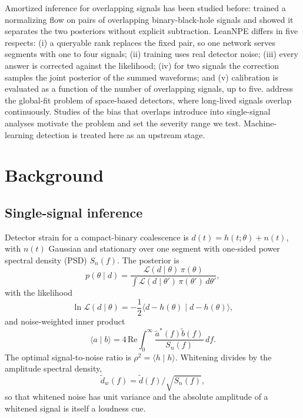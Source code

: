 \documentclass[twocolumn,linenumbers]{aastex701}
\begin{document}
Amortized inference for overlapping signals has been studied before:
\citet{Langendorff2023SBI} trained a normalizing flow on pairs of overlapping
binary-black-hole signals and showed it separates the two posteriors without
explicit subtraction. LeanNPE differs in five respects: (i) a queryable rank
replaces the fixed pair, so one network serves segments with one to four
signals; (ii) training uses real detector noise; (iii) every answer is
corrected against the likelihood; (iv) for two signals the correction samples
the joint posterior of the summed waveforms; and (v) calibration is evaluated
as a function of the number of overlapping signals, up to five. \citet{Chua2022Overlap} address
the global-fit problem of space-based detectors, where long-lived signals
overlap continuously. Studies of the bias that overlaps introduce into
single-signal analyses \citep{Antonelli2021Overlap, Relton2021Overlap,
Samajdar2021Global, Reali2023ET, Janquart2023Overlap} motivate the problem and
set the severity range we test. Machine-learning detection
\citep{Schafer2023MLGWSC, Marx2024PE} is treated here as an upstream stage.

\section{Background} \label{sec:background}

\subsection{Single-signal inference}

Detector strain for a compact-binary coalescence is $d(t) = h(t;\theta) +
n(t)$, with $n(t)$ Gaussian and stationary over one segment with one-sided
power spectral density (PSD) $S_n(f)$. The posterior is
\begin{equation}
p(\theta \mid d) = \frac{\mathcal{L}(d\mid\theta)\,\pi(\theta)}{\int \mathcal{L}(d\mid\theta')\,\pi(\theta')\,d\theta'},
\end{equation}
with the likelihood
\begin{equation}
\ln\mathcal{L}(d\mid\theta) = -\frac{1}{2}\big\langle d - h(\theta) \mid d - h(\theta)\big\rangle,
\label{eq:likelihood}
\end{equation}
and noise-weighted inner product
\begin{equation}
\langle a \mid b \rangle = 4\,\mathrm{Re}\int_0^{\infty} \frac{\tilde{a}^*(f)\tilde{b}(f)}{S_n(f)}\,df.
\label{eq:innerproduct}
\end{equation}
The optimal signal-to-noise ratio is $\rho^2 = \langle h \mid h\rangle$.
Whitening divides by the amplitude spectral density,
\begin{equation}
\tilde d_w(f) = \tilde d(f)/\sqrt{S_n(f)},
\label{eq:whitening}
\end{equation}
so that whitened noise has unit variance and the absolute amplitude of a
whitened signal is itself a loudness cue.
\end{document}
